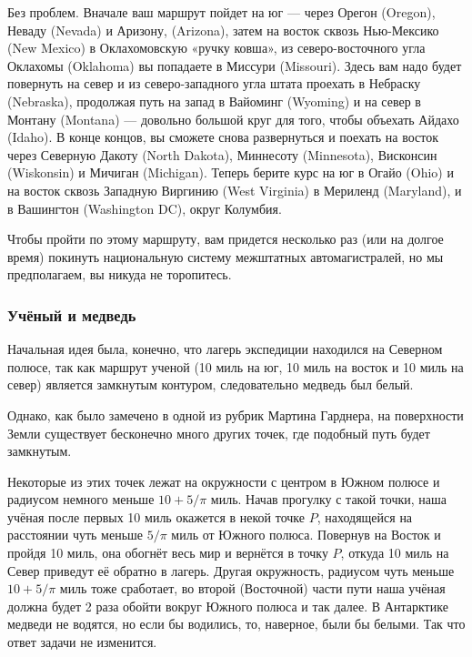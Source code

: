 Без проблем. Вначале ваш маршрут пойдет на юг ---  через Орегон (Oregon), 
Неваду (Nevada) 
и Аризону, (Arizona),  
затем на восток сквозь Нью-Мексико (New Mexico) 
в  Оклахомовскую «ручку ковша»,  из северо-восточного  угла Оклахомы (Oklahoma) 
вы попадаете в  Миссури (Missouri). 
Здесь вам надо будет повернуть на север и из северо-западного угла штата проехать в Небраску (Nebraska),  продолжая путь на  запад в Вайоминг (Wyoming)  и на север в Монтану (Montana) --- довольно большой круг для того, чтобы объехать Айдахо (Idaho). 
В конце концов, вы сможете снова развернуться и поехать на восток через Северную Дакоту (North Dakota), 
Миннесоту (Minnesota), 
Висконсин (Wiskonsin) 
и Мичиган (Michigan).
Теперь берите курс на юг в Огайо (Ohio) и на восток сквозь Западную Виргинию (West Virginia) в Мериленд (Maryland),
 и в Вашингтон (Washington DC), округ Колумбия.\heart


Чтобы пройти по этому маршруту, вам придется несколько раз (или на долгое время) покинуть национальную систему межштатных автомагистралей, но мы предполагаем,  вы никуда не торопитесь.


\subsubsection*{Учёный и медведь}%




Начальная идея была, конечно, что лагерь экспедиции находился на Северном полюсе, так как маршрут ученой (10 миль на юг, 10 миль на восток и 10 миль на север)  является замкнутым контуром, %
следовательно  медведь был белый.


Однако, как было замечено в одной из рубрик %
Мартина Гарднера, %
на поверхности Земли существует бесконечно много других точек, где подобный путь будет замкнутым.


Некоторые из этих точек лежат на окружности  с центром в Южном полюсе и радиусом немного меньше $10 + 5/\pi$ миль.
Начав   прогулку с такой точки,  наша учёная после первых 10 миль окажется в некой точке $P$,  
находящейся на расстоянии чуть меньше $5/\pi$ миль от Южного полюса.  
Повернув на Восток и пройдя 10 миль, она обогнёт весь мир и вернётся в точку $P$, откуда 10 миль на Север приведут её обратно в лагерь.
Другая окружность, радиусом чуть меньше $10 +  5/\pi$ миль тоже сработает, во второй (Восточной) части пути наша учёная должна будет 2 раза обойти вокруг Южного полюса  и так далее.
В Антарктике медведи не водятся, но если бы водились, то, наверное, были бы белыми.
Так что ответ задачи не изменится.\heart